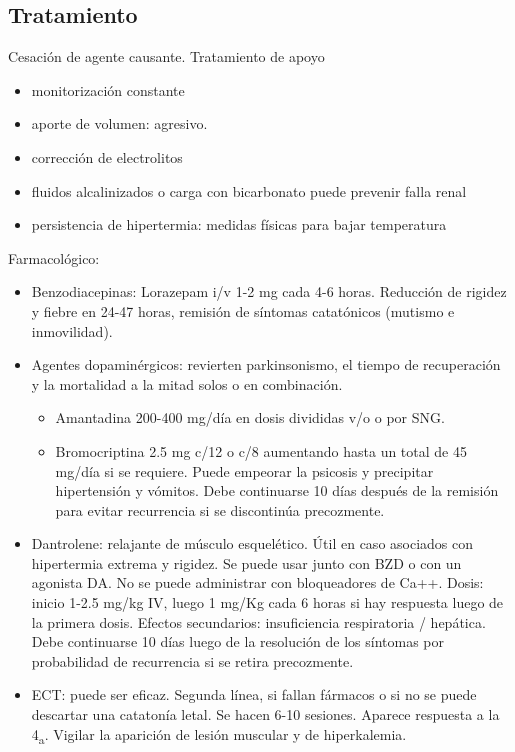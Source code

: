 \documentclass{scrbook}
\begin{document}
\subsection*{Tratamiento}
Cesación de agente causante.
Tratamiento de apoyo
\begin{itemize}
	\item monitorización constante
	\item aporte de volumen: agresivo.
	\item corrección de electrolitos
	\item fluidos alcalinizados o carga con bicarbonato puede prevenir falla renal
	\item persistencia de hipertermia: medidas físicas para bajar temperatura
\end{itemize}
Farmacológico:
\begin{itemize}
	\item Benzodiacepinas: Lorazepam i/v 1-2 mg cada 4-6 horas. Reducción de rigidez y fiebre en 24-47 horas, remisión de síntomas catatónicos (mutismo e inmovilidad).
	\item Agentes dopaminérgicos: revierten parkinsonismo, \faArrowDown el tiempo de recuperación y \faArrowDown la mortalidad a la mitad solos o en combinación.
	\begin{itemize}
		\item Amantadina 200-400 mg/día en dosis divididas v/o o por SNG.
		\item Bromocriptina 2.5 mg c/12 o c/8 aumentando hasta un total de 45 mg/día si se requiere. Puede empeorar la psicosis y precipitar hipertensión y vómitos. Debe continuarse 10 días después de la remisión para evitar recurrencia si se discontinúa precozmente.
	\end{itemize}
	\item Dantrolene: relajante de músculo esquelético. Útil en caso asociados con hipertermia extrema y rigidez. Se puede usar junto con BZD o con un agonista DA. No se puede administrar con bloqueadores de Ca++. Dosis: inicio 1-2.5 mg/kg IV, luego 1 mg/Kg cada 6 horas si hay respuesta luego de la primera dosis. Efectos secundarios: insuficiencia respiratoria / hepática. Debe continuarse 10 días luego de la resolución de los síntomas por probabilidad de recurrencia si se retira precozmente.
	\item ECT: puede ser eficaz. Segunda línea, si fallan fármacos o si no se puede descartar una catatonía letal. Se hacen 6-10 sesiones. Aparece respuesta a la 4\textsubscript{a}. Vigilar la aparición de lesión muscular y de hiperkalemia.
\end{itemize}
\end{document}
